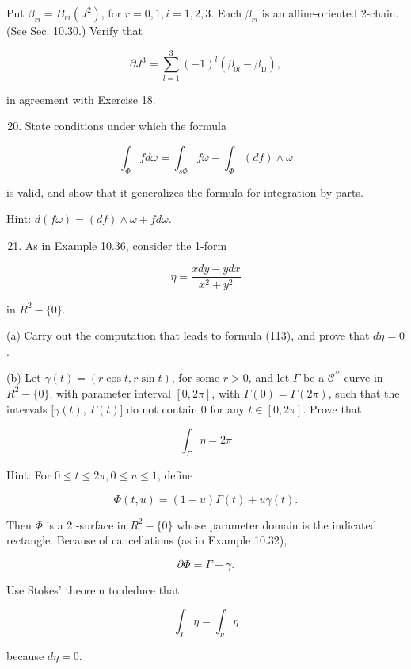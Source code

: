 \documentclass[10pt]{article}
\begin{document}
Put $\beta_{r i}=B_{r i}\left(J^{2}\right)$, for $r=0,1, i=1,2,3$. Each $\beta_{r i}$ is an affine-oriented 2-chain. (See Sec. 10.30.) Verify that

$$
\partial J^{3}=\sum_{l=1}^{3}(-1)^{l}\left(\beta_{0 l}-\beta_{1 l}\right),
$$

in agreement with Exercise 18.

\begin{enumerate}
  \setcounter{enumi}{19}
  \item State conditions under which the formula
\end{enumerate}

$$
\int_{\Phi} f d \omega=\int_{s \Phi} f \omega-\int_{\Phi}(d f) \wedge \omega
$$

is valid, and show that it generalizes the formula for integration by parts.

Hint: $d(f \omega)=(d f) \wedge \omega+f d \omega$.

\begin{enumerate}
  \setcounter{enumi}{20}
  \item As in Example 10.36, consider the 1-form
\end{enumerate}

$$
\eta=\frac{x d y-y d x}{x^{2}+y^{2}}
$$

in $R^{2}-\{0\}$.

(a) Carry out the computation that leads to formula (113), and prove that $d \eta=0$.

(b) Let $\gamma(t)=(r \cos t, r \sin t)$, for some $r>0$, and let $\Gamma$ be a $\mathscr{C}^{\prime \prime}$-curve in $R^{2}-\{0\}$, with parameter interval $[0,2 \pi]$, with $\Gamma(0)=\Gamma(2 \pi)$, such that the intervals $[\gamma(t)$, $\Gamma(t)]$ do not contain 0 for any $t \in[0,2 \pi]$. Prove that

$$
\int_{\Gamma} \eta=2 \pi
$$

Hint: For $0 \leq t \leq 2 \pi, 0 \leq u \leq 1$, define

$$
\Phi(t, u)=(1-u) \Gamma(t)+u \gamma(t) .
$$

Then $\Phi$ is a 2 -surface in $R^{2}-\{0\}$ whose parameter domain is the indicated rectangle. Because of cancellations (as in Example 10.32),

$$
\partial \Phi=\Gamma-\gamma .
$$

Use Stokes' theorem to deduce that

$$
\int_{\Gamma} \eta=\int_{\nu} \eta
$$

because $d \eta=0$.
\end{document}
